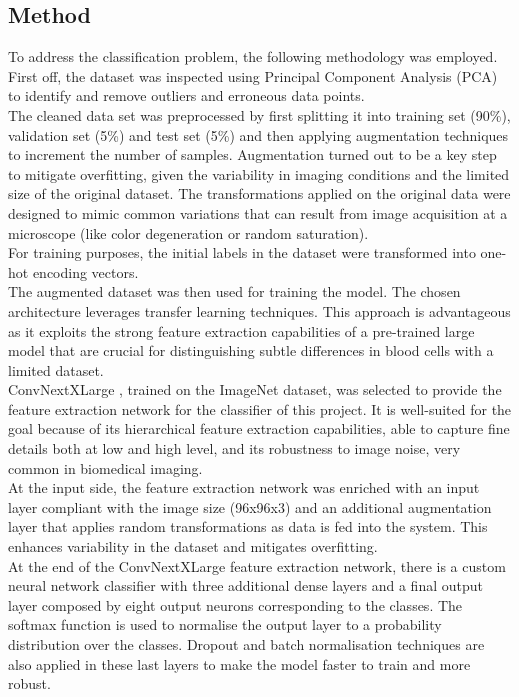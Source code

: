 \documentclass[11pt]{article}
\begin{document}
\begin{multicols}{2}
        \section{Method}
        \label{sec:method}
        
        To address the classification problem, the following methodology was employed. First off, the dataset was inspected using Principal Component Analysis (PCA) to identify and remove outliers and erroneous data points.\\
        The cleaned data set was preprocessed by first splitting it into training set (90\%), validation set (5\%) and test set (5\%) and then applying augmentation techniques to increment the number of samples. Augmentation turned out to be a key step to mitigate overfitting, given the variability in imaging conditions and the limited size of the original dataset. The transformations applied on the original data were designed to mimic common variations that can result from image acquisition at a microscope (like color degeneration or random saturation). \\
        For training purposes, the initial labels in the dataset were transformed into one-hot encoding vectors. \\
        The augmented dataset was then used for training the model. The chosen architecture leverages transfer learning techniques. This approach is advantageous as it exploits the strong feature extraction capabilities of a pre-trained large model that are crucial for distinguishing subtle differences in blood cells with a limited dataset.\\
        ConvNextXLarge \cite{liu2022convnext}, trained on the ImageNet dataset, was selected to provide the feature extraction network for the classifier of this project. It is well-suited for the goal because of its hierarchical feature extraction capabilities, able to capture fine details both at low and high level, and its robustness to image noise, very common in biomedical imaging. \\
        At the input side, the feature extraction network was enriched with an input layer compliant with the image size (96x96x3) and an additional augmentation layer that applies random transformations as data is fed into the system. This enhances variability in the dataset and mitigates overfitting. \\
        At the end of the ConvNextXLarge feature extraction network, there is a custom neural network classifier with three additional dense layers and a final output layer composed by eight output neurons corresponding to the classes. The softmax function is used to normalise the output layer to a probability distribution over the classes. Dropout and batch normalisation techniques are also applied in these last layers to make the model faster to train and more robust.

\end{multicols}
\end{document}
